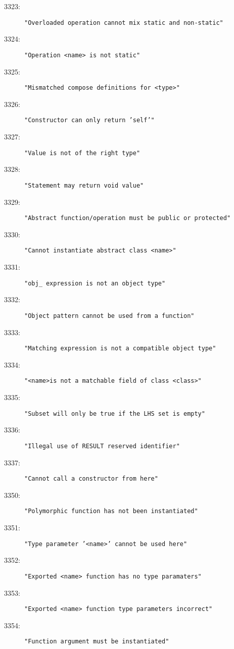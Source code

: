 \begin{description}
\item[3323:] \texttt{"Overloaded operation cannot mix static and non-static"}
\item[3324:] \texttt{"Operation <name> is not static"}
\item[3325:] \texttt{"Mismatched compose definitions for <type>"}
\item[3326:] \texttt{"Constructor can only return 'self'"}
\item[3327:] \texttt{"Value is not of the right type"}
\item[3328:] \texttt{"Statement may return void value"}
\item[3329:] \texttt{"Abstract function/operation must be public or protected"}
\item[3330:] \texttt{"Cannot instantiate abstract class <name>"}
\item[3331:] \texttt{"obj\_ expression is not an object type"}
\item[3332:] \texttt{"Object pattern cannot be used from a function"}
\item[3333:] \texttt{"Matching expression is not a compatible object type"}
\item[3334:] \texttt{"<name>is not a matchable field of class <class>"}
\item[3335:] \texttt{"Subset will only be true if the LHS set is empty"}
\item[3336:] \texttt{"Illegal use of RESULT reserved identifier"}
\item[3337:] \texttt{"Cannot call a constructor from here"}
\item[3350:] \texttt{"Polymorphic function has not been instantiated"}
\item[3351:] \texttt{"Type parameter '<name>' cannot be used here"}
\item[3352:] \texttt{"Exported <name> function has no type paramaters"}
\item[3353:] \texttt{"Exported <name> function type parameters incorrect"}
\item[3354:] \texttt{"Function argument must be instantiated"}

\end{description}
